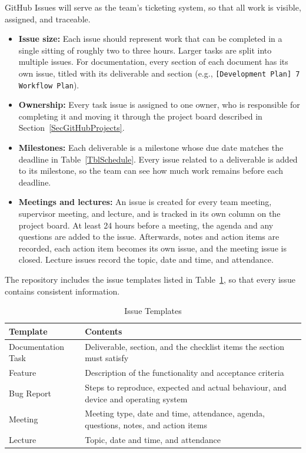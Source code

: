 \documentclass{article}
\begin{document}
GitHub Issues will serve as the team's ticketing system, so that all work is visible, assigned, and traceable.

\begin{itemize}
  \item \textbf{Issue size:} Each issue should represent work that can be completed in a single sitting of roughly two to three hours. Larger tasks are split into multiple issues. For documentation, every section of each document has its own issue, titled with its deliverable and section (e.g., \texttt{[Development Plan] 7 Workflow Plan}).
  \item \textbf{Ownership:} Every task issue is assigned to one owner, who is responsible for completing it and moving it through the project board described in Section~\ref{SecGitHubProjects}.
  \item \textbf{Milestones:} Each deliverable is a milestone whose due date matches the deadline in Table~\ref{TblSchedule}. Every issue related to a deliverable is added to its milestone, so the team can see how much work remains before each deadline.
  \item \textbf{Meetings and lectures:} An issue is created for every team meeting, supervisor meeting, and lecture, and is tracked in its own column on the project board. At least 24 hours before a meeting, the agenda and any questions are added to the issue. Afterwards, notes and action items are recorded, each action item becomes its own issue, and the meeting issue is closed. Lecture issues record the topic, date and time, and attendance.
\end{itemize}

The repository includes the issue templates listed in Table~\ref{TblIssueTemplates}, so that every issue contains consistent information.

\begin{table}[H]
  \caption{Issue Templates} \label{TblIssueTemplates}
  \begin{tabularx}{\textwidth}{lX}
    \toprule
    \textbf{Template} & \textbf{Contents}\\
    \midrule
      Documentation Task & Deliverable, section, and the checklist items the section must satisfy\\
      Feature & Description of the functionality and acceptance criteria\\
      Bug Report & Steps to reproduce, expected and actual behaviour, and device and operating system\\
      Meeting & Meeting type, date and time, attendance, agenda, questions, notes, and action items\\
      Lecture & Topic, date and time, and attendance\\
    \bottomrule
  \end{tabularx}
\end{table}
\end{document}
